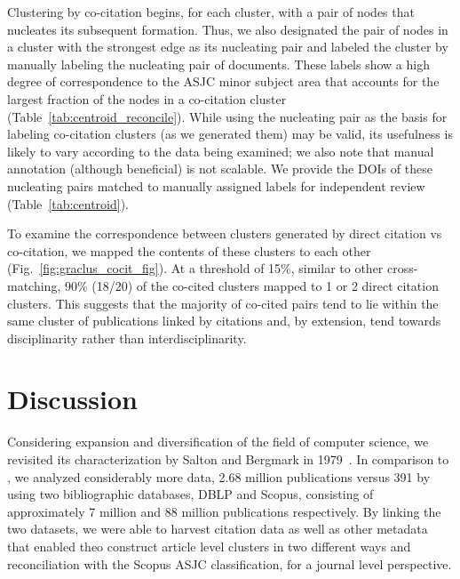 Clustering by co-citation begins, for each cluster, with a pair of nodes that nucleates its subsequent formation. Thus, we also designated the pair of nodes in a cluster with the strongest edge as its nucleating pair and labeled the cluster by manually labeling the nucleating pair of documents. These labels show a high degree of correspondence  to the ASJC minor subject area that accounts for the largest fraction of the nodes in a co-citation cluster (Table~\ref{tab:centroid_reconcile}). While using the nucleating pair as the basis for labeling co-citation clusters (as we generated them) may be valid, its usefulness is likely to vary according to the data being examined; we also note that manual annotation (although beneficial) is not scalable. We provide the DOIs of these nucleating pairs matched to manually assigned labels for independent review (Table~\ref{tab:centroid}).

To examine the correspondence between clusters generated by direct citation vs co-citation, we mapped the contents of these clusters to each other (Fig.~\ref{fig:graclus_cocit_fig}).
 At a threshold of 15\%, similar to other cross-matching, 90\% (18/20) of the co-cited clusters mapped to 1 or 2 direct citation clusters. This suggests that the majority of co-cited pairs tend to lie within the same cluster of publications linked by citations and,  by extension, tend towards disciplinarity rather than interdisciplinarity.
\clearpage
\section{Discussion} 
Considering expansion and diversification of the field of computer science, we revisited its characterization by Salton and Bergmark in 1979~\cite{salton_citation_1979}. In comparison to \cite{salton_citation_1979}, we analyzed considerably more data, 2.68 million publications versus 391 by using two bibliographic databases, DBLP and Scopus, consisting of  approximately 7 million and 88 million publications respectively. By linking the two datasets, we were able to harvest citation data as well as other metadata that enabled theo construct article level clusters in two different ways and reconciliation with the Scopus ASJC classification, for a journal level perspective.

